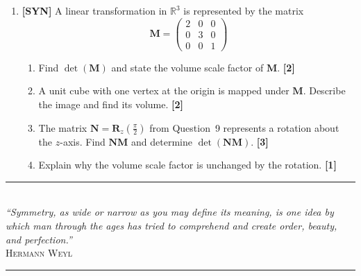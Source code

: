 \documentclass[11pt,a4paper]{article}
\begin{document}
\begin{enumerate}[resume]
\item \textbf{[SYN]} A linear transformation in $\mathbb{R}^3$ is represented by the matrix
\[
\mathbf{M} = \begin{pmatrix} 2 & 0 & 0 \\ 0 & 3 & 0 \\ 0 & 0 & 1 \end{pmatrix}
\]
\begin{enumerate}
  \item Find $\det(\mathbf{M})$ and state the volume scale factor of $\mathbf{M}$. \hfill{\small\textbf{[2]}}
  \item A unit cube with one vertex at the origin is mapped under $\mathbf{M}$. Describe the image and find its volume. \hfill{\small\textbf{[2]}}
  \item The matrix $\mathbf{N} = \mathbf{R}_z\!\left(\frac{\pi}{2}\right)$ from Question~9 represents a rotation about the $z$-axis. Find $\mathbf{N}\mathbf{M}$ and determine $\det(\mathbf{N}\mathbf{M})$. \hfill{\small\textbf{[3]}}
  \item Explain why the volume scale factor is unchanged by the rotation. \hfill{\small\textbf{[1]}}
\end{enumerate}

\end{enumerate}

\vspace{10pt}
\begin{center}
  {\color{accentline}\rule{0.4\textwidth}{0.4pt}}\\[4pt]
  {\footnotesize\itshape\color{medgray} ``Symmetry, as wide or narrow as you may define its meaning, is one idea by which man through the ages has tried to comprehend and create order, beauty, and perfection.''}\\[2pt]
  {\scriptsize\scshape\color{medgray} Hermann Weyl}\\[4pt]
  {\color{accentline}\rule{0.4\textwidth}{0.4pt}}
\end{center}
\end{document}
